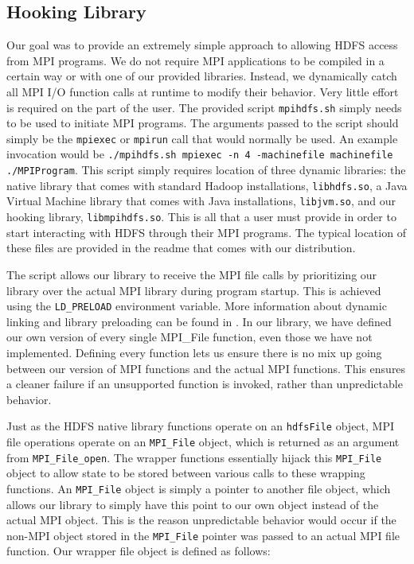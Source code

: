 \subsection{Hooking Library}
Our goal was to provide an extremely simple approach to allowing HDFS access
from MPI programs. We do not require MPI applications to be compiled in a
certain way or with one of our provided libraries. Instead, we dynamically catch
all MPI I/O function calls at runtime to modify their behavior. Very little
effort is required on the part of the user. The provided script
\texttt{mpihdfs.sh} simply needs to be used to initiate MPI programs. The
arguments passed to the script should simply be the \texttt{mpiexec} or
\texttt{mpirun} call that would normally be used. An example invocation would be
\texttt{./mpihdfs.sh mpiexec -n 4 -machinefile machinefile ./MPIProgram}. This
script simply requires location of three dynamic libraries: the native library
that comes with standard Hadoop installations, \texttt{libhdfs.so}, a Java
Virtual Machine library that comes with Java installations, \texttt{libjvm.so},
and our hooking library, \texttt{libmpihdfs.so}. This is all that a user must
provide in order to start interacting with HDFS through their MPI programs. The
typical location of these files are provided in the readme that comes with our
distribution.

The script allows our library to receive the MPI file calls by prioritizing our
library over the actual MPI library during program startup. This is achieved
using the \texttt{LD\_PRELOAD} environment variable. More information about
dynamic linking and library preloading can be found in \cite{ld.so}. In our
library, we have defined our own version of every single MPI\_File function,
even those we have not implemented. Defining every function lets us ensure there
is no mix up going between our version of MPI functions and the actual MPI
functions. This ensures a cleaner failure if an unsupported function is invoked,
rather than unpredictable behavior. 

Just as the HDFS native library functions operate on an \texttt{hdfsFile}
object, MPI file operations operate on an \texttt{MPI\_File} object, which is
returned as an argument from \texttt{MPI\_File\_open}. The wrapper functions
essentially hijack this \texttt{MPI\_File} object to allow state to be stored
between various calls to these wrapping functions. An \texttt{MPI\_File} object
is simply a pointer to another file object, which allows our library to simply
have this point to our own object instead of the actual MPI object. This is the
reason unpredictable behavior would occur if the non-MPI object stored in the
\texttt{MPI\_File} pointer was passed to an actual MPI file function. Our
wrapper file object is defined as follows:


